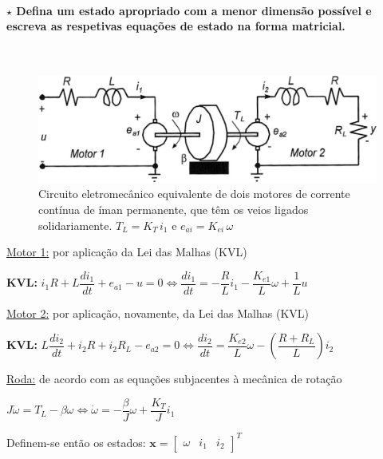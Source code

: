 \paragraph[2.2.3.3 Problema 3]{$\pmb{\star}$ Defina um estado apropriado com a menor dimensão possível e escreva as respetivas equações de estado na forma matricial.}\mbox{}\\
\begin{figure}[H]
    \centering
    \includegraphics[width = 0.6\linewidth]{img/1/motor-cc-exame2021.png}
    \caption{Circuito eletromecânico equivalente de dois motores de corrente contínua de íman permanente, que têm os veios ligados solidariamente. $T_L = K_T\, i_1$ e $e_{ai} = K_{ei}\, \omega$}
    \label{fig:motor-cc-exame20/21}
\end{figure}

\noindent \underline{Motor 1:} por aplicação da Lei das Malhas (KVL)

\noindent \hspace*{1.5 em}\raisebox{0.2 em}{$\drsh$} \textbf{KVL:} $i_1 R + L \dfrac{d i_1}{dt} + e_{a1} - u = 0 \iff \dfrac{d i_1}{dt} = - \dfrac{R}{L} i_1 - \dfrac{K_{e1}}{L} \omega + \dfrac{1}{L}u$

\vspace{0.5em}
\noindent \underline{Motor 2:} por aplicação, novamente, da Lei das Malhas (KVL)

\noindent \hspace*{1.5 em}\raisebox{0.2 em}{$\drsh$} \textbf{KVL:} $L \dfrac{d i_2}{dt} + i_2 R + i_2 R_L - e_{a2} = 0 \iff \dfrac{d i_2}{dt} = \dfrac{K_{e2}}{L}\omega - \left(\dfrac{R+R_L}{L}\right) i_2$

\vspace{0.5em}
\noindent \underline{Roda:} de acordo com as equações subjacentes à mecânica de rotação

\noindent \hspace*{1.5 em}\raisebox{0.2 em}{$\drsh$} $J \dot{\omega} = T_L - \beta \omega \iff \dot{\omega} = -\dfrac{\beta}{J}\omega + \dfrac{K_T}{J} i_1$

\vspace{0.5em}
\noindent Definem-se então os estados: $\pmb{x} = \begin{bmatrix} \omega & i_1 & i_2 \end{bmatrix}^T$

